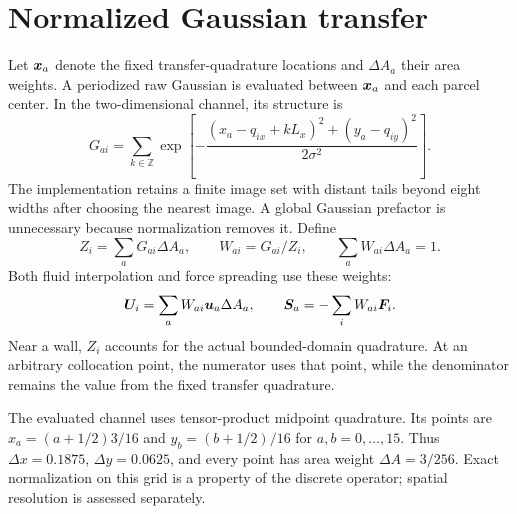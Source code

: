 \section{Normalized Gaussian transfer}
Let $\bm{x}_a$ denote the fixed transfer-quadrature locations and
$\Delta A_a$ their area weights. A periodized raw Gaussian is evaluated
between $\bm{x}_a$ and each parcel center. In the two-dimensional channel,
its structure is
\begin{equation}
 G_{ai}=\sum_{k\in\mathbb{Z}}
 \exp\left[-\frac{(x_a-q_{ix}+kL_x)^2+(y_a-q_{iy})^2}
 {2\sigma^2}\right].
 \label{eq:raw_kernel}
\end{equation}
The implementation retains a finite image set with distant tails beyond
eight widths after choosing the nearest image. A global Gaussian prefactor
is unnecessary because normalization removes it. Define
\begin{equation}
 Z_i=\sum_aG_{ai}\Delta A_a,\qquad W_{ai}=G_{ai}/Z_i,
 \qquad \sum_aW_{ai}\Delta A_a=1.
 \label{eq:normalized_kernel}
\end{equation}
Both fluid interpolation and force spreading use these weights:
\begin{equation}
 \bm{U}_i=\sum_aW_{ai}\bm{u}_a\Delta A_a,\qquad
 \bm{S}_a=-\sum_iW_{ai}\bm{F}_i.
 \label{eq:shared_transfer}
\end{equation}
Near a wall, $Z_i$ accounts for the actual bounded-domain quadrature.
At an arbitrary collocation point, the numerator uses that point, while
the denominator remains the value from the fixed transfer quadrature.

The evaluated channel uses tensor-product midpoint quadrature. Its points
are $x_a=(a+1/2)3/16$ and $y_b=(b+1/2)/16$ for $a,b=0,\ldots,15$.
Thus $\Delta x=0.1875$, $\Delta y=0.0625$, and every point has area weight
$\Delta A=3/256$. Exact normalization on this grid is a property of the
discrete operator; spatial resolution is assessed separately.

